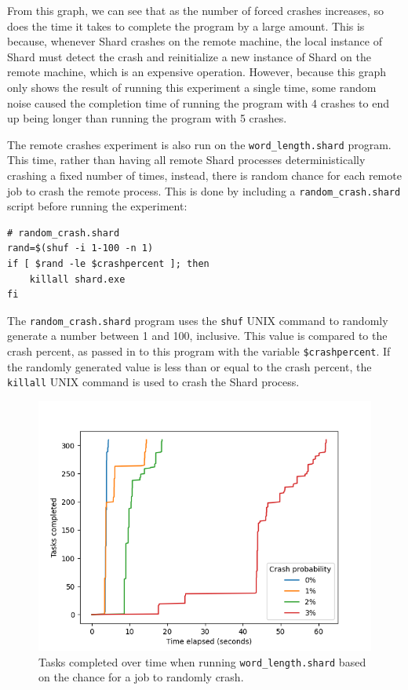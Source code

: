 \documentclass[oneside]{report}
\begin{document}
From this graph, we can see that as the number of forced crashes increases, so does the time it takes to complete the program by a large amount.
This is because, whenever Shard crashes on the remote machine, the local instance of Shard must detect the crash and reinitialize a new instance of Shard on the remote machine, which is an expensive operation.
However, because this graph only shows the result of running this experiment a single time, some random noise caused the completion time of running the program with 4 crashes to end up being longer than running the program with 5 crashes.

The remote crashes experiment is also run on the \texttt{word\_length.shard} program.
This time, rather than having all remote Shard processes deterministically crashing a fixed number of times, instead, there is random chance for each remote job to crash the remote process.
This is done by including a \texttt{random\_crash.shard} script before running the experiment:

\begin{minipage}[c]{\textwidth-15pt}
  \begin{lstlisting}[language=Shard]
# random_crash.shard
rand=$(shuf -i 1-100 -n 1)
if [ $rand -le $crashpercent ]; then
    killall shard.exe
fi
\end{lstlisting}
  \smallskip
\end{minipage}

The \texttt{random\_crash.shard} program uses the \texttt{shuf} UNIX command to randomly generate a number between 1 and 100, inclusive.
This value is compared to the crash percent, as passed in to this program with the variable \texttt{\$crashpercent}.
If the randomly generated value is less than or equal to the crash percent, the \texttt{killall} UNIX command is used to crash the Shard process.

\begin{figure}[h]
  \begin{center}
    \includegraphics[scale=0.9]{img/experiments/e6_1620960581241.png}
    \caption{Tasks completed over time when running \texttt{word\_length.shard} based on the chance for a job to randomly crash.}
    \label{fig:crashwordlength}
  \end{center}
\end{figure}
\end{document}
